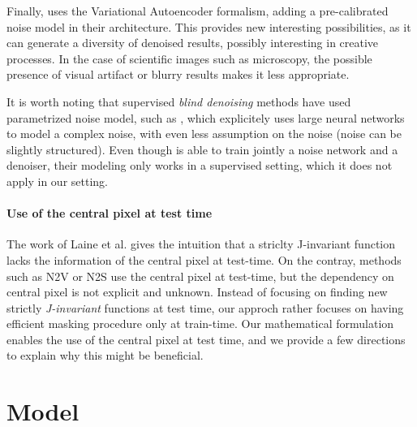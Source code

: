 \documentclass{article}
\begin{document}
Finally, \cite{2020DivNoising} uses the Variational Autoencoder formalism, adding a pre-calibrated noise model in their architecture. This provides new interesting possibilities, as it can generate a diversity of denoised results, possibly interesting in creative processes. In the case of scientific images such as microscopy, the possible presence of visual artifact or blurry results makes it less appropriate.

It is worth noting that supervised \textit{blind denoising} methods have used parametrized noise model, such as \cite{zhang2017beyond,yue2019variational}, which explicitely uses large neural networks to model a complex noise, with even less assumption on the noise (noise can be slightly structured). Even though \cite{yue2019variational} is able to train jointly a noise network and a denoiser, their modeling only works in a supervised setting, which it does not apply in our setting.

\paragraph{Use of the central pixel at test time} The work of Laine et al. \cite{laine2019high} gives the intuition that a striclty J-invariant function lacks the information of the central pixel at test-time. On the contray, methods such as N2V or N2S use the central pixel at test-time, but the dependency on central pixel is not explicit and unknown. Instead of focusing on finding new strictly \textit{J-invariant} functions at test time, our approch rather focuses on having efficient masking procedure only at train-time. Our mathematical formulation enables the use of the central pixel at test time, and we provide a few directions to explain why this might be beneficial.

\section{Model}
\label{sec:model}
\end{document}
